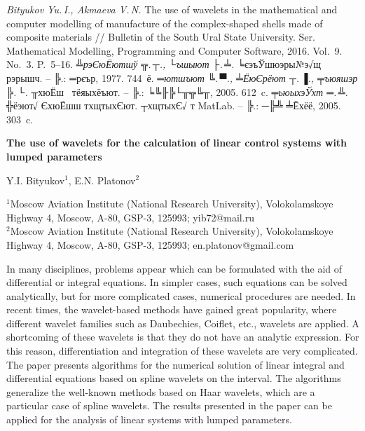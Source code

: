 \documentclass[12pt, a4paper, oneside]{article}
\begin{document}
\begin{thebibliography}{99}
 \textit{Bityukov Yu.\,I.,  Akmaeva V.\,N. }  The use of wavelets in the mathematical and computer modelling of manufacture of the complex-shaped shells made of composite materials //  Bulletin of the South Ural State University. Ser. Mathematical Modelling, Programming and Computer Software, 2016. Vol.~9. No.~3. P.~5--16.
  \textit{╩рэЄюЁютшў ╦.\,┬.,  └ъшыют ├.\,╧.} ╘єэъЎшюэры№э√щ рэрышч. -- ╠.: ═рєър, 1977. 744~ё.
  \textit{═ютшъют ╚.\,▀.,  ╧ЁюЄрёют ┬.\,▐.,  ╤ъюяшэр ╠.\,└.} ╥хюЁш  тёяыхёъют. -- ╠.: ╘╚╟╠└╥╦╚╥, 2005.  612~c.
 \textit{╤ьюыхэЎхт ═.\,╩}. ╬ёэют√ ЄхюЁшш тхщтыхЄют. ┬хщтыхЄ√ т MatLab. -- ╠.: ─╠╩ ╧Ёхёё,  2005. 303~c.
\end{thebibliography}
\begin{center}
{\bf The use of wavelets for the calculation of linear control systems with lumped parameters}\par
{Y.I. Bityukov$^1$, E.N. Platonov$^2$}
\end{center}
 $^1$Moscow Aviation Institute (National Research University), Volokolamskoye Highway 4, Moscow, A-80, GSP-3, 125993; yib72@mail.ru\\
 $^2$Moscow Aviation Institute (National Research University), Volokolamskoye Highway 4, Moscow, A-80, GSP-3, 125993;  en.platonov@gmail.com

 In many disciplines, problems appear which can be formulated with the aid of differential or integral equations.  In simpler cases, such equations can be solved analytically, but for more complicated cases, numerical procedures are needed. In recent times, the wavelet-based methods have gained great popularity, where different wavelet families such as Daubechies, Coiflet, etc., wavelets are applied. A shortcoming of these wavelets is that they do not have an analytic expression. For this reason, differentiation and integration of these wavelets are very complicated. The paper presents algorithms for the numerical solution of linear integral and differential equations based on spline wavelets on the interval. The algorithms generalize the well-known methods based on Haar wavelets, which are a particular case of spline wavelets. The results presented in the paper can be applied for the analysis of linear systems with lumped parameters.
\end{document}
